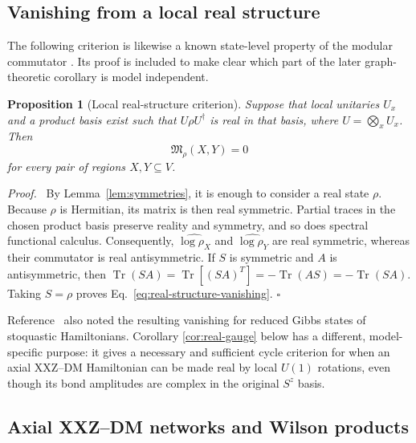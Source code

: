 \documentclass[aps,prb,preprint,nofootinbib,longbibliography]{revtex4-2}
\newcommand{\Tr}{\operatorname{Tr}}
\newcommand{\Mmod}{\mathfrak{M}}
\newtheorem{proposition}[theorem]{Proposition}
\newenvironment{proof}{\par\noindent\textit{Proof.}\ }%
{\unskip\nobreak\hfill\(\square\)\par}
\begin{document}
\subsection{Vanishing from a local real structure}

The following criterion is likewise a known state-level property of the
modular commutator \cite{KimEtAl2022PRB}.  Its proof is included to make clear
which part of the later graph-theoretic corollary is model independent.

\begin{proposition}[Local real-structure criterion]
\label{prop:real-structure}
Suppose that local unitaries $U_x$ and a product basis exist such that
$U\rho U^\dagger$ is real in that basis, where $U=\bigotimes_xU_x$.  Then
\begin{equation}
 \Mmod_\rho(X,Y)=0
 \label{eq:real-structure-vanishing}
\end{equation}
for every pair of regions $X,Y\subseteq V$.
\end{proposition}

\begin{proof}
By Lemma~\ref{lem:symmetries}, it is enough to consider a real state $\rho$.
Because $\rho$ is Hermitian, its matrix is then real symmetric.  Partial
traces in the chosen product basis preserve reality and symmetry, and so does
spectral functional calculus.  Consequently,
$\widehat{\log\rho_X}$ and $\widehat{\log\rho_Y}$ are real symmetric,
whereas their commutator is real antisymmetric.  If $S$ is symmetric and $A$
is antisymmetric, then
\(
\Tr(SA)=\Tr[(SA)^T]=-\Tr(AS)=-\Tr(SA)
\).
Taking $S=\rho$ proves Eq.~\eqref{eq:real-structure-vanishing}.
\end{proof}

Reference~\cite{KimEtAl2022PRB} also noted the resulting vanishing for
reduced Gibbs states of stoquastic Hamiltonians.  Corollary
\ref{cor:real-gauge} below has a different, model-specific purpose: it gives
a necessary and sufficient cycle criterion for when an axial XXZ--DM
Hamiltonian can be made real by local $U(1)$ rotations, even though its bond
amplitudes are complex in the original $S^z$ basis.

\subsection{Axial XXZ--DM networks and Wilson products}
\label{sec:axial}
\end{document}
